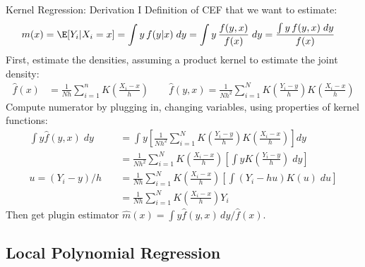 \documentclass[aspectratio=169, handout]{beamer}
\newcommand{\sumin}{\sum^n_{i=1}}
\newcommand{\sumiN}{\sum^N_{i=1}}
\begin{document}
{\scriptsize
\begin{frame}{Kernel Regression: Derivation I}
Definition of CEF that we want to estimate:
\vspace{-4pt}
\begin{align*}
  m(x)
  =
  \E[Y_i|X_i=x]
  &=
  \int y \, f(y|x)\;dy
  =
  \int y \, \frac{f(y,x)}{f(x)}\;dy
  =
  \frac{%
    \int y  \,f(y,x)\;dy
  }{%
    f(x)
  }
\end{align*}
\vspace{-4pt}
\pause
First, estimate the densities, assuming a product kernel to
estimate the joint density:
\begin{align*}
  \widehat{f}(x)
  &=
  \frac{1}{Nh}
  \sumin
  K\left(
  \frac{X_i-x}{h}
  \right)
  \qquad
  \widehat{f}(y,x)
  =
  \frac{1}{Nh^2}
  \sumiN
  K\left(
  \frac{Y_i-y}{h}
  \right)
  K\left(
  \frac{X_i-x}{h}
  \right)
\end{align*}
\pause
Compute numerator by plugging in, changing variables, using
properties of kernel functions:
\vspace{-4pt}
\begin{align*}
  \int y \hat{f}(y,x)\;dy
  &=
  \int
  y
  \left[
  \frac{1}{Nh^2}
  \sumiN
  K\left(
  \frac{Y_i-y}{h}
  \right)
  K\left(
  \frac{X_i-x}{h}
  \right)
  \right]
  dy
  \\
  &=
  \frac{1}{Nh^2}
  \sumiN
  K\left(
  \frac{X_i-x}{h}
  \right)
  \left[
  \int
  y
  K\left(
  \frac{Y_i-y}{h}
  \right)
  \;dy
  \right]
  \\
  u=(Y_i-y)/h
  \quad
  &=
  \frac{1}{Nh}
  \sumiN
  K\left(
  \frac{X_i-x}{h}
  \right)
  \left[
  \int
  (Y_i-hu)
  K\left(
  u
  \right)
  \;du
  \right]
  \\
  &=
  \frac{1}{Nh}
  \sumiN
  K\left(
  \frac{X_i-x}{h}
  \right)
  Y_i
\end{align*}
\vspace{-3pt}
Then get plugin estimator $\hat{m}(x)=\int y
\hat{f}(y,x)\,dy/\hat{f}(x)$.
\end{frame}
}


\subsection{Local Polynomial Regression}
\end{document}
